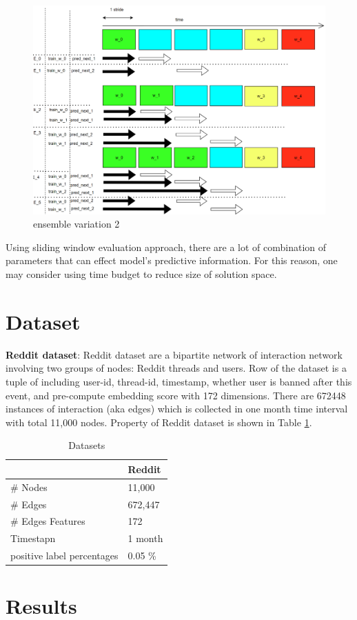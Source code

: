 \documentclass{IEEEtran}
\begin{document}
\begin{figure}[htbp]
\centering
\includegraphics[width=.9\linewidth]{./images/screenshot_20220321_124707.png}
\caption{\label{ensemble_variation_2}ensemble variation 2}
\end{figure}

Using sliding window evaluation approach, there are a lot of combination of parameters that can effect model's predictive information. For this reason, one may consider using time budget to reduce size of solution space.
\section{Dataset}
\label{sec:orgbeb9fa1}
\textbf{Reddit dataset}: Reddit dataset are a bipartite network of interaction network involving two groups of nodes: Reddit threads and users. Row of the dataset is a tuple of including user-id, thread-id, timestamp, whether user is banned after this event, and pre-compute embedding score with 172 dimensions. There are 672448 instances of interaction (aka edges) which is collected in one month time interval with total 11,000 nodes. Property of Reddit dataset is shown in Table \ref{Datasets}.

\begin{table}[htbp]
\caption{\label{Datasets}Datasets}
\centering
\begin{tabular}{ll}
\hline
\hline
 & Reddit\\
\hline
\# Nodes & 11,000\\
\# Edges & 672,447\\
\# Edges Features & 172\\
Timestapn & 1 month\\
positive label percentages & 0.05 \%\\
\end{tabular}
\end{table}
\section{Results}
\label{sec:org9fe57e4}
\printbibliography
\end{document}
